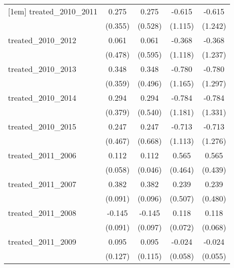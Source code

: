 {\begin{tabular}{l*{4}{c}}
[1em]
treated\_2010\_2011&       0.275         &       0.275         &      -0.615         &      -0.615         \\
            &     (0.355)         &     (0.528)         &     (1.115)         &     (1.242)         \\
[1em]
treated\_2010\_2012&       0.061         &       0.061         &      -0.368         &      -0.368         \\
            &     (0.478)         &     (0.595)         &     (1.118)         &     (1.237)         \\
[1em]
treated\_2010\_2013&       0.348         &       0.348         &      -0.780         &      -0.780         \\
            &     (0.359)         &     (0.496)         &     (1.165)         &     (1.297)         \\
[1em]
treated\_2010\_2014&       0.294         &       0.294         &      -0.784         &      -0.784         \\
            &     (0.379)         &     (0.540)         &     (1.181)         &     (1.331)         \\
[1em]
treated\_2010\_2015&       0.247         &       0.247         &      -0.713         &      -0.713         \\
            &     (0.467)         &     (0.668)         &     (1.113)         &     (1.276)         \\
[1em]
treated\_2011\_2006&       0.112         &       0.112\sym{*}  &       0.565         &       0.565         \\
            &     (0.058)         &     (0.046)         &     (0.464)         &     (0.439)         \\
[1em]
treated\_2011\_2007&       0.382\sym{***}&       0.382\sym{***}&       0.239         &       0.239         \\
            &     (0.091)         &     (0.096)         &     (0.507)         &     (0.480)         \\
[1em]
treated\_2011\_2008&      -0.145         &      -0.145         &       0.118         &       0.118         \\
            &     (0.091)         &     (0.097)         &     (0.072)         &     (0.068)         \\
[1em]
treated\_2011\_2009&       0.095         &       0.095         &      -0.024         &      -0.024         \\
            &     (0.127)         &     (0.115)         &     (0.058)         &     (0.055)         \\

\end{tabular}}
